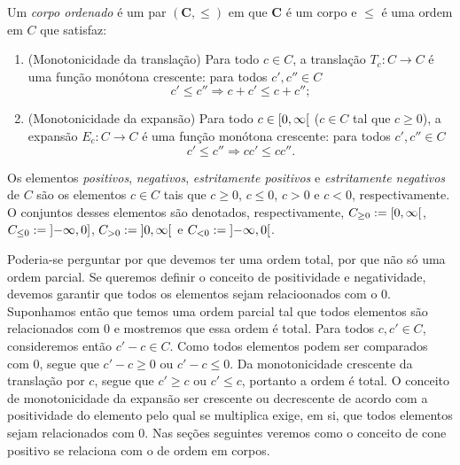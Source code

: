 \begin{definition}
Um \emph{corpo ordenado} é um par $(\bm C, \leq)$ em que $\bm C$ é um corpo e $\leq$ é uma ordem em $C$ que satisfaz:
	\begin{enumerate}
	\item (Monotonicidade da translação) Para todo $c \in C$, a translação $T_c\colon C \to C$ é uma função monótona crescente: para todos $c',c'' \in C$
		\begin{equation*}
		c' \leq c'' \Rightarrow c+c' \leq c+c'';
		\end{equation*}
	\item (Monotonicidade da expansão) Para todo $c \in \left[{0},{\infty}\right[$ ($c \in C$ tal que $c \geq 0$), a expansão $E_c\colon C \to C$ é uma função monótona crescente: para todos $c',c'' \in C$
		\begin{equation*}
		c' \leq c'' \Rightarrow cc' \leq cc''.
		\end{equation*}
 	\end{enumerate}
Os elementos \emph{positivos}, \emph{negativos}, \emph{estritamente positivos} e \emph{estritamente negativos} de $C$ são os elementos $c \in C$ tais que $c \geq 0$, $c \leq 0$, $c>0$ e $c<0$, respectivamente. O conjuntos desses elementos são denotados, respectivamente, $C_{\geq 0} := \left[{0},{\infty}\right[$, $C_{\leq 0} := \left]{-\infty},{0}\right]$, $C_{> 0} := \left]{0},{\infty}\right[$ e $C_{< 0} := \left]{-\infty},{0}\right[$.
\end{definition}

Poderia-se perguntar por que devemos ter uma ordem total, por que não só uma ordem parcial. Se queremos definir o conceito de positividade e negatividade, devemos garantir que todos os elementos sejam relacioonados com o $0$. Suponhamos então que temos uma ordem parcial tal que todos elementos são relacionados com $0$ e mostremos que essa ordem é total. Para todos $c,c' \in C$, consideremos então $c'-c \in C$. Como todos elementos podem ser comparados com $0$, segue que $c'-c \geq 0$ ou $c'-c \leq 0$. Da monotonicidade crescente da translação por $c$, segue que $c' \geq c$ ou $c' \leq c$, portanto a ordem é total. O conceito de monotonicidade da expansão ser crescente ou decrescente de acordo com a positividade do elemento pelo qual se multiplica exige, em si, que todos elementos sejam relacionados com $0$. Nas seções seguintes veremos como o conceito de cone positivo se relaciona com o de ordem em corpos.

